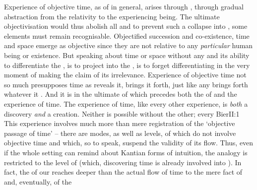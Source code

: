 Experience of {objective} time, as of  in general, arises
through , through gradual abstraction from the relativity
to the experiencing being. The ultimate objectivisation would thus abolish
all  and to prevent such a collapse into , some
elements must remain recognisable. Objectified succession and co-existence, 
time and space emerge as objective since they are not relative to
any {\em particular} human being or existence. But speaking about time or space
without any  and its ability to differentiate the ,
is to project  into the , is to forget
differentiating  in
the very moment of making the claim of its irrelevance. 
Experience of {objective} time not so much presupposes  time as
reveals it, brings it forth, just like any  brings forth
whatever it . And it is  in the ultimate
 of  which precedes both the  of
 and the experience of time. The experience of time, like every
other experience, is {\em both} a discovery {\em and} a creation. Neither
  is possible without the other; every \citet{[a]pprehension is not only a
    reflection but also a creative transformation.}{Bier}{II:1}
This experience involves much more than mere registration of the `objective passage of
time' -- there are modes, as well as levels, of  which do not
involve {objective} time and which, so to speak, suspend the validity of its
flow.  Thus, even if the whole setting can remind about Kantian forms of
intuition, the analogy is restricted to the level of 
(which, discovering  time is already involved into ).
%
%
In fact, the  of our  reaches deeper than the actual
flow of time to the mere fact of  and, eventually, of the
